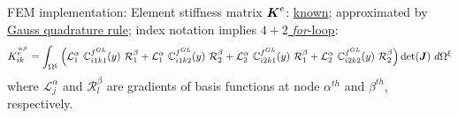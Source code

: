 \documentclass[25pt, a0paper,
portrait,
margin=2mm, 
innermargin=2mm, 
blockverticalspace=7mm, %
colspace=2mm, %
subcolspace=0mm]{tikzposter}
\makeatletter
\newcommand*{\inputfig}[3][htb]{{
    \def\fps@figure{#1}
    \def\DIR{#2}
    \def\LABEL{#3}
    \graphicspath{{\DIR/}}
    
}}
\makeatother
\begin{document}
{\begin{minipage}{0.54\textwidth}
		\begin{mdframed}
			FEM implementation:
			Element stiffness matrix ${\boldsymbol{\mathnormal K}}^{e}$: \underline{known}; 
			approximated by \underline{Gauss quadrature rule}; index notation implies \underline{$4+2$ \textit{for}-loop}:
			\begin{align*}
				K^{\stackrel{\alpha\beta}{e\ \ }}_{ik} = 
				\int_{\Omega^{\xi}}
				\left(
				\mathcal{L}^{\alpha}_{1} \ \mathbb{C}_{i1k1}^{f^{GL}}(y) \ \mathcal{R}^{\beta}_{1} +
				\mathcal{L}^{\alpha}_{1} \ \mathbb{C}_{i1k2}^{f^{GL}}(y) \ \mathcal{R}^{\beta}_{2} +
				\mathcal{L}^{\alpha}_{2} \ \mathbb{C}_{i2k1}^{f^{GL}}(y) \ \mathcal{R}^{\beta}_{1} +
				\mathcal{L}^{\alpha}_{2} \ \mathbb{C}_{i2k2}^{f^{GL}}(y) \ \mathcal{R}^{\beta}_{2}
				\right)
				\det({\boldsymbol{\mathnormal J}}) \ d\Omega^{\xi}
			\end{align*}
			where $\mathcal{L}^{\alpha}_{j}$ and $\mathcal{R}^{\beta}_{l}$ are gradients of basis functions at node $\alpha^{th}$ and $\beta^{th}$, respectively.
		\end{mdframed}
	\end{minipage}
}
\end{document}
